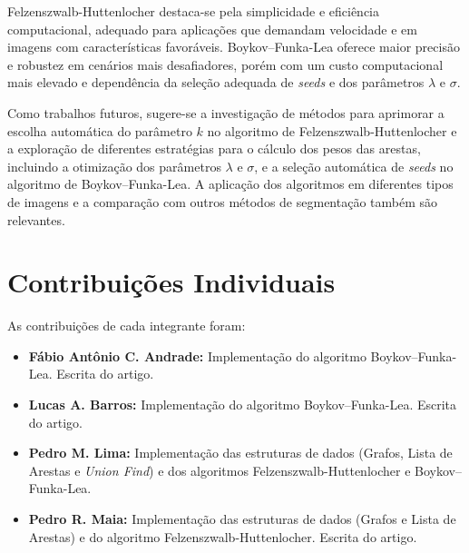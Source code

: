 \documentclass[12pt]{article}
\begin{document}
Felzenszwalb-Huttenlocher destaca-se pela simplicidade e eficiência computacional, adequado para aplicações que demandam velocidade e em imagens com características favoráveis. Boykov--Funka-Lea oferece maior precisão e robustez em cenários mais desafiadores, porém com um custo computacional mais elevado e dependência da seleção adequada de \textit{seeds} e dos parâmetros $\lambda$ e $\sigma$.

Como trabalhos futuros, sugere-se a investigação de métodos para aprimorar a escolha automática do parâmetro $k$ no algoritmo de Felzenszwalb-Huttenlocher e a exploração de diferentes estratégias para o cálculo dos pesos das arestas, incluindo a otimização dos parâmetros $\lambda$ e $\sigma$, e a seleção automática de \textit{seeds} no algoritmo de Boykov--Funka-Lea. A aplicação dos algoritmos em diferentes tipos de imagens e a comparação com outros métodos de segmentação também são relevantes.

\section*{Contribuições Individuais}
As contribuições de cada integrante foram:
\begin{itemize}
    \item \textbf{Fábio Antônio C. Andrade:} Implementação do algoritmo Boykov--Funka-Lea. Escrita do artigo.
    \item \textbf{Lucas A. Barros:} Implementação do algoritmo Boykov--Funka-Lea. Escrita do artigo.
    \item \textbf{Pedro M. Lima:} Implementação das estruturas de dados (Grafos, Lista de Arestas e \textit{Union Find}) e dos algoritmos Felzenszwalb-Huttenlocher e Boykov--Funka-Lea.
    \item \textbf{Pedro R. Maia:} Implementação das estruturas de dados (Grafos e Lista de Arestas) e do algoritmo Felzenszwalb-Huttenlocher. Escrita do artigo.
\end{itemize}



\end{document}
